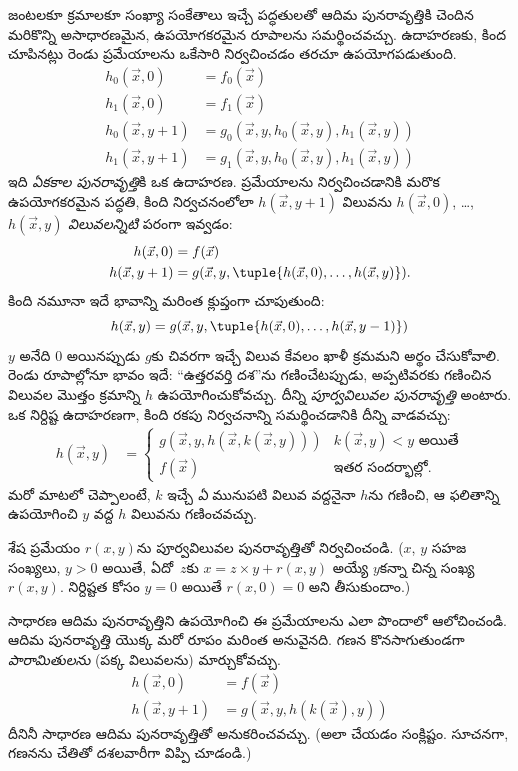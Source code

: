 \documentclass[../../../include/open-logic-section]{subfiles}
\begin{document}

జంటలకూ క్రమాలకూ సంఖ్యా సంకేతాలు ఇచ్చే పద్ధతులతో ఆదిమ పునరావృత్తికి చెందిన
మరికొన్ని అసాధారణమైన, ఉపయోగకరమైన రూపాలను సమర్థించవచ్చు. ఉదాహరణకు,
కింద చూపినట్లు రెండు ప్రమేయాలను ఒకేసారి నిర్వచించడం తరచూ ఉపయోగపడుతుంది.
\begin{align*}
h_0(\vec x, 0) & = f_0(\vec x) \\
h_1(\vec x, 0) & = f_1(\vec x) \\
h_0(\vec x, y+1) & = g_0(\vec x, y, h_0(\vec x, y), h_1(\vec x, y)) \\
h_1(\vec x, y+1) & = g_1(\vec x, y, h_0(\vec x, y), h_1(\vec x, y))
\end{align*}
ఇది \emph{ఏకకాల పునరావృత్తి}కి ఒక ఉదాహరణ. ప్రమేయాలను
నిర్వచించడానికి మరొక ఉపయోగకరమైన పద్ధతి, కింది నిర్వచనంలోలా
$h(\vec x,y+1)$ విలువను $h(\vec x,0)$, \dots,~$h(\vec x,y)$
\emph{విలువలన్నిటి} పరంగా ఇవ్వడం:
\begin{align*}
h(\vec x, 0) & = f(\vec x) \\
h(\vec x, y+1) & = g(\vec x, y, \tuple{h(\vec x, 0), \dots, h(\vec x, y)}).
\end{align*}
కింది నమూనా ఇదే భావాన్ని మరింత క్లుప్తంగా చూపుతుంది:
\[
h(\vec x, y) = g(\vec x, y, \tuple{h(\vec x, 0), \dots, h(\vec x, y-1)})
\]
$y$ అనేది $0$ అయినప్పుడు $g$కు చివరగా ఇచ్చే విలువ కేవలం ఖాళీ క్రమమని
అర్థం చేసుకోవాలి. రెండు రూపాల్లోనూ భావం ఇదే: ``ఉత్తరవర్తి దశ''ను
గణించేటప్పుడు, అప్పటివరకు గణించిన విలువల మొత్తం క్రమాన్ని $h$
ఉపయోగించుకోవచ్చు. దీన్ని \emph{పూర్వవిలువల పునరావృత్తి} అంటారు.
ఒక నిర్దిష్ట ఉదాహరణగా, కింది రకపు నిర్వచనాన్ని సమర్థించడానికి దీన్ని
వాడవచ్చు:
\begin{align*}
h(\vec x, y) & = \begin{cases}
  g(\vec x, y, h(\vec x, k(\vec x, y))) & \text{$k(\vec x,y)<y$ అయితే} \\
  f(\vec x) & \text{ఇతర సందర్భాల్లో.}
\end{cases}
\end{align*}
మరో మాటలో చెప్పాలంటే, $k$ ఇచ్చే \emph{ఏ} మునుపటి విలువ వద్దనైనా $h$ను
గణించి, ఆ ఫలితాన్ని ఉపయోగించి $y$ వద్ద $h$ విలువను గణించవచ్చు.


\begin{prob}
  శేష ప్రమేయం $r(x,y)$ను పూర్వవిలువల పునరావృత్తితో నిర్వచించండి.
  ($x$, $y$ సహజ సంఖ్యలు, $y>0$ అయితే, ఏదో~$z$కు
  $x=z\times y+r(x,y)$ అయ్యే $y$కన్నా చిన్న సంఖ్య $r(x,y)$.
  నిర్దిష్టత కోసం $y=0$ అయితే $r(x,0)=0$ అని తీసుకుందాం.)
\end{prob}

సాధారణ ఆదిమ పునరావృత్తిని ఉపయోగించి ఈ ప్రమేయాలను ఎలా పొందాలో
ఆలోచించండి. ఆదిమ పునరావృత్తి యొక్క మరో రూపం మరింత అనువైనది.
గణన కొనసాగుతుండగా \emph{పారామితులను} (పక్క విలువలను) మార్చుకోవచ్చు.
\begin{align*}
h(\vec x, 0) & = f(\vec x) \\
h(\vec x, y+1) & = g(\vec x, y, h(k(\vec x), y))
\end{align*}
దీనినీ సాధారణ ఆదిమ పునరావృత్తితో అనుకరించవచ్చు. (అలా చేయడం
సంక్లిష్టం. సూచనగా, గణనను చేతితో దశలవారీగా విప్పి చూడండి.)
\end{document}
